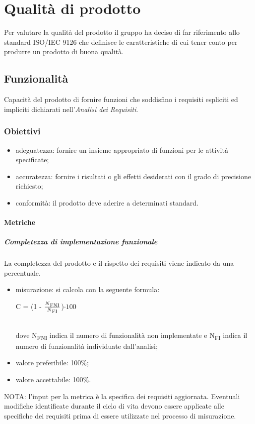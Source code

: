 \section{Qualità di prodotto}
Per valutare la qualità del prodotto il gruppo ha deciso di far riferimento allo standard ISO/IEC 9126 che definisce le caratteristiche di cui tener conto per produrre un prodotto di buona qualità.
	\subsection{Funzionalità}
	Capacità del prodotto di fornire funzioni che soddisfino i requisiti espliciti ed impliciti dichiarati nell'\textit{Analisi dei Requisiti}.
		\subsubsection{Obiettivi}
		\begin{itemize}
			\item adeguatezza: fornire un insieme appropriato di funzioni per le attività specificate;
			\item accuratezza: fornire i risultati o gli effetti desiderati con il grado di precisione richiesto;
			\item conformità: il prodotto deve aderire a determinati standard. %
		\end{itemize}
		\paragraph{Metriche}
			\subparagraph{Completezza di implementazione funzionale}
			La completezza del prodotto e il rispetto dei requisiti viene indicato da una percentuale.
			\begin{itemize}
			\item misurazione: si calcola con la seguente formula: \\
			\centerline { C = (1 - \(\frac{N\textsubscript{FNI}}{N\textsubscript{FI}} \))$ \cdot  100$ } \\
			dove N\textsubscript{FNI} indica il numero di funzionalità non implementate e N\textsubscript{FI} indica il numero di funzionalità individuate dall'analisi;
			\item valore preferibile: 100\%;
			\item valore accettabile: 100\%.
			\end{itemize}
			NOTA: l'input per la metrica è la specifica dei requisiti aggiornata. Eventuali modifiche identificate durante il ciclo di vita devono essere applicate alle specifiche dei requisiti prima di essere utilizzate nel processo di misurazione.
